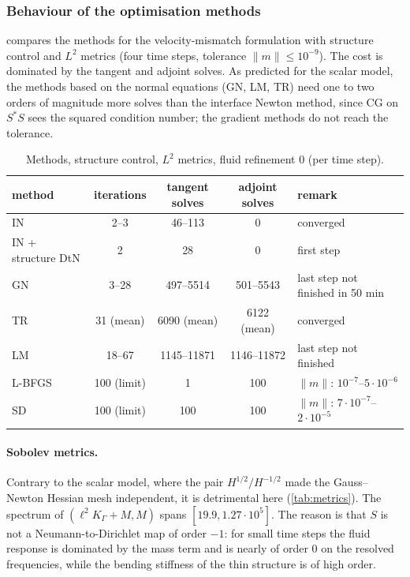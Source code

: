 \documentclass[11pt,a4paper]{article}
\theoremstyle{definition}
\theoremstyle{remark}
\newcommand{\G}{\Gamma}
\newcommand{\M}{M}
\begin{document}
\subsubsection{Behaviour of the optimisation methods}\label{sec:results_methods}

 compares the methods for the velocity-mismatch formulation with structure
control and $L^2$ metrics (four time steps, tolerance $\|m\|\le10^{-9}$). The cost is dominated by
the tangent and adjoint solves. As predicted for the scalar model, the methods based on the normal
equations (GN, LM, TR) need one to two orders of magnitude more solves than the interface Newton
method, since CG on $S^*S$ sees the squared condition number; the gradient methods do not reach the
tolerance.

\begin{table}[ht]\centering
\caption{Methods, structure control, $L^2$ metrics, fluid refinement 0 (per time step).}
\label{tab:methods}
\small
\begin{tabular}{lcccp{4.2cm}}
\toprule
method & iterations & tangent solves & adjoint solves & remark\\
\midrule
IN & 2--3 & 46--113 & 0 & converged\\
IN + structure DtN & 2 & 28 & 0 & first step\\
GN & 3--28 & 497--5514 & 501--5543 & last step not finished in 50 min\\
TR & 31 (mean) & 6090 (mean) & 6122 (mean) & converged\\
LM & 18--67 & 1145--11871 & 1146--11872 & last step not finished\\
L-BFGS & 100 (limit) & 1 & 100 & $\|m\|$: $10^{-7}$--$5\cdot10^{-6}$\\
SD & 100 (limit) & 100 & 100 & $\|m\|$: $7\cdot10^{-7}$--$2\cdot10^{-5}$\\
\bottomrule
\end{tabular}
\end{table}

\paragraph{Sobolev metrics.} Contrary to the scalar model, where the pair $H^{1/2}/H^{-1/2}$ made
the Gauss--Newton Hessian mesh independent, it is detrimental here (\cref{tab:metrics}). The
spectrum of $(\ell^2K_\G+\M,\M)$ spans $[19.9,1.27\cdot10^5]$. The reason is that $S$ is not a
Neumann-to-Dirichlet map of order $-1$: for small time steps the fluid response is dominated by the
mass term and is nearly of order $0$ on the resolved frequencies, while the bending stiffness of
the thin structure is of high order.
\end{document}
